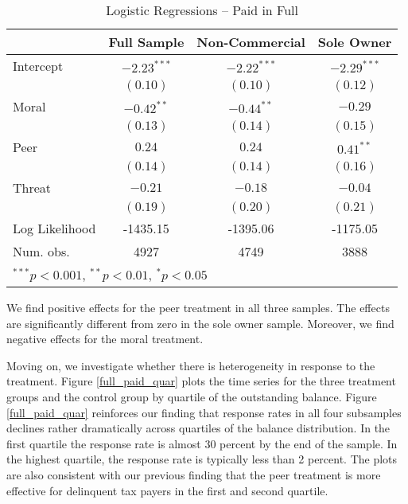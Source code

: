 \documentclass[12pt,titlepage]{article}
\begin{document}
\begin{table}[htbp]
\caption{Logistic Regressions -- Paid in Full}\label{VV}
\begin{center}
\begin{tabular}{l c c c }
\hline
               & Full Sample & Non-Commercial & Sole Owner \\
\hline
Intercept      & $-2.23^{***}$ & $-2.22^{***}$ & $-2.29^{***}$ \\
               & $(0.10)$      & $(0.10)$      & $(0.12)$      \\
Moral          & $-0.42^{**}$  & $-0.44^{**}$  & $-0.29$       \\
               & $(0.13)$      & $(0.14)$      & $(0.15)$      \\
Peer           & $0.24$        & $0.24$        & $0.41^{**}$   \\
               & $(0.14)$      & $(0.14)$      & $(0.16)$      \\
Threat         & $-0.21$       & $-0.18$       & $-0.04$       \\
               & $(0.19)$      & $(0.20)$      & $(0.21)$      \\
\hline
Log Likelihood & -1435.15      & -1395.06      & -1175.05      \\
Num. obs.      & 4927          & 4749          & 3888          \\
\hline
\multicolumn{4}{l}{\scriptsize{$^{***}p<0.001$, $^{**}p<0.01$, $^*p<0.05$}}
\end{tabular}
\end{center}
\end{table}
We find positive effects for the peer treatment in all three samples. The
effects are significantly different from zero in the sole owner sample. Moreover,
we find negative effects for the moral treatment.

Moving on, we investigate whether there is heterogeneity in response to the
treatment.  Figure \ref{full_paid_quar} plots the time series for the
three treatment groups and the control group by quartile of the
outstanding balance.  Figure \ref{full_paid_quar} reinforces our
finding that response rates in all four subsamples declines rather
dramatically across quartiles of the balance distribution. In the
first quartile the response rate is almost 30 percent by the end of
the sample. In the highest quartile, the response rate is typically
less than 2 percent.  The plots are also consistent with our previous
finding that the peer treatment is more effective for delinquent tax
payers in the first and second quartile.
\end{document}
